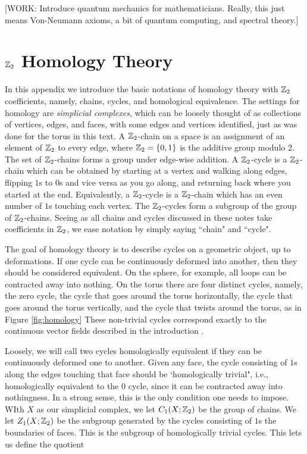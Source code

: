 \documentclass{article}
\theoremstyle{definition}
\numberwithin{figure}{section}
\begin{document}
[WORK: Introduce quantum mechanics for mathematicians. Really, this just means Von-Neumann axioms, a bit of quantum computing, and spectral theory.]

\section{$\mathbb{Z}_2$ Homology Theory}
\label{Homology}

In this appendix we introduce the basic notations of homology theory with $\mathbb{Z}_2$ coefficients, namely, chains, cycles, and homological equivalence. The settings for homology are \textit{simplicial complexes}, which can be loosely thought of as collections of vertices, edges, and faces, with some edges and vertices identified, just as was done for the torus in this text. A $\mathbb{Z}_2$-chain on a space is an assignment of an element of $\mathbb{Z}_2$ to every edge, where $\mathbb{Z}_2=\{0,1\}$ is the additive group modulo 2. The set of $\mathbb{Z}_2$-chains forms a group under edge-wise addition. A $\mathbb{Z}_2$-cycle is a $\mathbb{Z}_2$-chain which can be obtained by starting at a vertex and walking along edges, flipping $1$s to $0$s and vice versa as you go along, and returning back where you started at the end. Equivalently, a $\mathbb{Z}_2$-cycle is a $\mathbb{Z}_2$-chain which has an even number of $1$s touching each vertex. The $\mathbb{Z}_2$-cycles form a subgroup of the group of $\mathbb{Z}_2$-chains. Seeing as all chains and cycles discussed in these notes take coefficients in $\mathbb{Z}_2$, we ease notation by simply saying ``chain" and ``cycle".

The goal of homology theory is to describe cycles on a geometric object, up to deformations. If one cycle can be continuously deformed into another, then they should be considered equivalent. On the sphere, for example, all loops can be contracted away into nothing. On the torus there are four distinct cycles, namely, the zero cycle, the cycle that goes around the torus horizontally, the cycle that goes around the torus vertically, and the cycle that twists around the torus, as in Figure \ref{fig:homology} These non-trivial cycles correspond exactly to the continuous vector fields described in the introduction \cite{frankel1957homology}.

Loosely, we will call two cycles homologically equivalent if they can be continuously deformed one to another. Given any face, the cycle consisting of $1$s along the edges touching that face should be `homologically trivial", i.e., homologically equivalent to the $0$ cycle, since it can be contracted away into nothingness. In a strong sense, this is the only condition one needs to impose. WIth $X$ as our simplicial complex, we let $C_1(X;\mathbb{Z}_2)$ be the group of chains. We let $Z_1(X;\mathbb{Z}_2)$ be the subgroup generated by the cycles consisting of $1$s  the boundaries of faces. This is the subgroup of homologically trivial cycles. This lets us define the quotient
\end{document}
